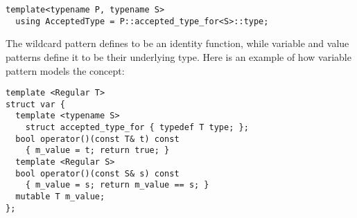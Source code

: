 \begin{lstlisting}
template<typename P, typename S>
  using AcceptedType = P::accepted_type_for<S>::type;
\end{lstlisting}

\noindent
The wildcard pattern defines  to be an identity 
function, while variable and value patterns define it to be their underlying 
type. Here is an example of how variable pattern models the concept: 

\begin{lstlisting}
template <Regular T>
struct var {
  template <typename S> 
    struct accepted_type_for { typedef T type; };
  bool operator()(const T& t) const 
    { m_value = t; return true; }
  template <Regular S> 
  bool operator()(const S& s) const
    { m_value = s; return m_value == s; }
  mutable T m_value;
};
\end{lstlisting}

%


